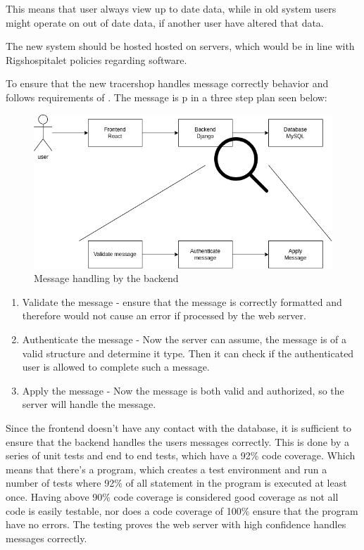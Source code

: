 \documentclass{article}
\begin{document}
This means that user always view up to date data, while in old system users might operate on out of date data, if another user have altered that data.

The new system should be hosted hosted on  servers, which would be in line with Rigshospitalet policies regarding software.

To ensure that the new tracershop handles message correctly behavior and follows requirements of . The message is p in a three step plan seen below:
\begin{figure}[ht]
  \begin{center}
    \includegraphics[width=0.6\linewidth]{MessageHandeling.png}
    \caption{Message handling by the backend}
    \label{fig:messageHandle}
  \end{center}
\end{figure}

\begin{enumerate}
  \item Validate the message - ensure that the message is correctly formatted and therefore would not cause an error if processed by the web server.
  \item Authenticate the message - Now the server can assume, the message is of a valid structure and determine it type.
  Then it can check if the authenticated user is allowed to complete such a message.
  \item Apply the message - Now the message is both valid and authorized, so the server will handle the message.
\end{enumerate}

Since the frontend doesn't have any contact with the database,
it is sufficient to ensure that the backend handles the users messages correctly.
This is done by a series of unit tests and end to end tests, which have a 92\% code coverage.
Which means that there's a program, which creates a test environment and run a number of tests where 92\% of all statement in the program is executed at least once.
Having above 90\% code coverage is considered good coverage as not all code is easily testable, nor does a code coverage of 100\% ensure that the program have no errors.
The testing proves the web server with high confidence handles messages correctly.
\end{document}
